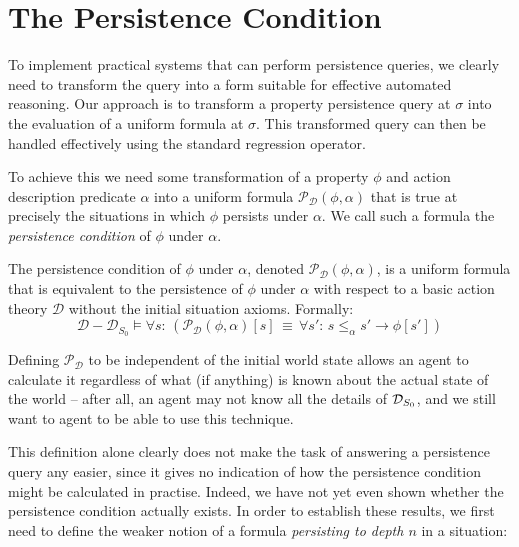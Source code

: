 \section{The Persistence Condition\label{sec:Persistence:Condition}}

To implement practical systems that can perform persistence queries,
we clearly need to transform the query into a form suitable for effective
automated reasoning. Our approach is to transform a property persistence
query at $\sigma$ into the evaluation of a uniform formula at $\sigma$.
This transformed query can then be handled effectively using the standard
regression operator.

To achieve this we need some transformation of a property $\phi$
and action description predicate $\alpha$ into a uniform formula
$\mathcal{P}_{\mathcal{D}}(\phi,\alpha)$ that is true at precisely
the situations in which $\phi$ persists under $\alpha$. We call
such a formula the \emph{persistence condition} of $\phi$ under $\alpha$.

\begin{defnL}
 The persistence condition of $\phi$
under $\alpha$, denoted $\mathcal{P}_{\mathcal{D}}(\phi,\alpha)$,
is a uniform formula that is equivalent to the persistence of $\phi$
under $\alpha$ with respect to a basic action theory $\mathcal{D}$
without the initial situation axioms. Formally:\label{def:persistence-condition}\[
\mathcal{D}-\mathcal{D}_{S_{0}}\models\forall s:\,\left(\mathcal{P_{D}}(\phi,\alpha)[s]\,\equiv\,\forall s':\, s\leq_{\alpha}s'\rightarrow\phi[s']\right)\]

\end{defnL}
Defining $\mathcal{P}_{\mathcal{D}}$ to be independent of the initial
world state allows an agent to calculate it regardless of what (if
anything) is known about the actual state of the world -- after all,
an agent may not know all the details of $\mathcal{D}_{S_{0}}$, and we still
want to agent to be able to use this technique.

This definition alone clearly does not make the task of answering
a persistence query any easier, since it gives no indication of how
the persistence condition might be calculated in practise. Indeed,
we have not yet even shown whether the persistence condition actually
exists. In order to establish these results, we first need to define
the weaker notion of a formula \emph{persisting to depth $n$} in
a situation:

